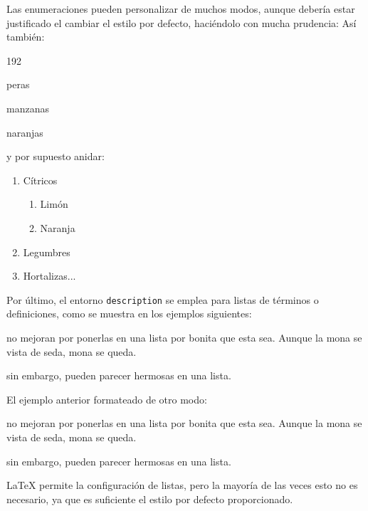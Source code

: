 \noindent Las enumeraciones pueden personalizar de muchos modos, aunque debería estar justificado el cambiar el estilo por defecto, haciéndolo con mucha prudencia:
\noindent Así también:

\begin{dingautolist}{192} %
	\item peras
	\item manzanas
	\item naranjas
\end{dingautolist}






\noindent y por supuesto anidar:

\begin{enumerate}
  \item Cítricos
  \begin{enumerate}
    \item Limón
    \item Naranja
  \end{enumerate}
  \item Legumbres
  \item Hortalizas...
\end{enumerate}


\noindent Por último, el entorno {\tt description} se emplea para listas de términos o definiciones, como se muestra en los ejemplos siguientes:

\begin{description}[noitemsep]
	\item[Estupideces] no mejoran por ponerlas en una lista por bonita que esta sea. Aunque la mona se vista de seda, mona se queda.
	\item[Lucideces] sin embargo, pueden parecer hermosas en
	una lista.
\end{description}

\noindent El ejemplo anterior formateado de otro modo:

\begin{description}[style=nextline]
	\item[Estupideces] no mejoran por ponerlas en una lista por bonita que esta sea. Aunque la mona se vista de seda, mona se queda.
	\item[Lucideces] sin embargo, pueden parecer hermosas en una lista.
\end{description}

\LaTeX{} permite la configuración de listas, pero la mayoría de las veces esto no es necesario, ya que es suficiente el estilo por defecto proporcionado.
